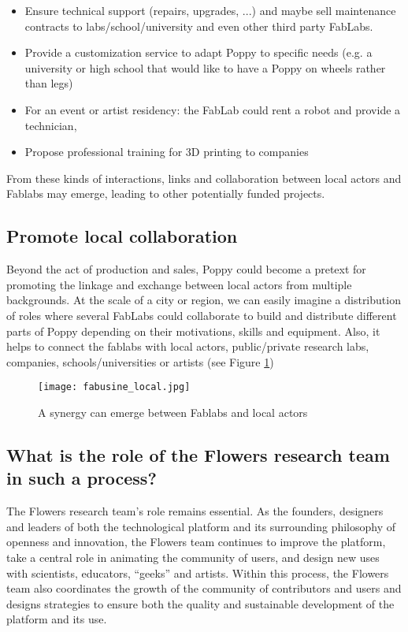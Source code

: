 \begin{itemize}
    \item Ensure technical support (repairs, upgrades, ...) and maybe sell maintenance contracts to labs/school/university and even other third party FabLabs.
    \item Provide a customization service to adapt Poppy to specific needs (e.g. a university or high school that would like to have a Poppy on wheels rather than legs)
    \item For an event or artist residency: the FabLab could rent a robot and provide a technician,
    \item Propose professional training for 3D printing to companies
\end{itemize}

From these kinds of interactions, links and collaboration between local actors and Fablabs may emerge, leading to other potentially funded projects.

\subsection{Promote local collaboration} %

Beyond the act of production and sales, Poppy could become a pretext for promoting the linkage and exchange between local actors from multiple backgrounds. At the scale of a city or region, we can easily imagine a distribution of roles where several FabLabs could collaborate to build and distribute different parts of Poppy depending on their motivations, skills and equipment.
Also, it helps to connect the fablabs with local actors, public/private research labs, companies, schools/universities or artists (see Figure \ref{fig:local_synergy})

\begin{figure}[tb]
    \begin{center}
        \texttt{[image: fabusine\_local.jpg]}
    \end{center}
    \caption{A synergy can emerge between Fablabs and local actors}
    \label{fig:local_synergy}
\end{figure}

\subsection{What is the role of the Flowers research team in such a process? } %

The Flowers research team's role remains essential. As the founders, designers and leaders of both the technological platform and its surrounding philosophy of openness and innovation, the Flowers team continues to improve the platform, take a central role in animating the community of users, and design new uses with scientists, educators, “geeks” and artists. Within this process, the Flowers team also coordinates the growth of the community of contributors and users and designs strategies to ensure both the quality and sustainable development of the platform and its use.


